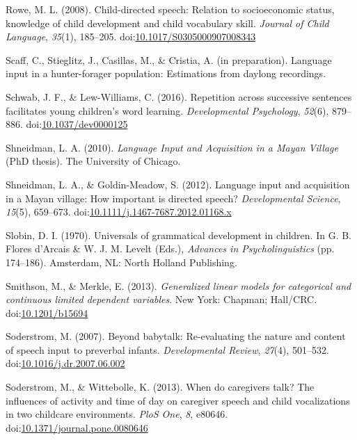 \documentclass[floatsintext,man]{apa6}
\theoremstyle{definition}
\theoremstyle{definition}
\theoremstyle{definition}
\theoremstyle{remark}
\begin{document}
\hypertarget{ref-rowe2008child}{}
Rowe, M. L. (2008). Child-directed speech: Relation to socioeconomic
status, knowledge of child development and child vocabulary skill.
\emph{Journal of Child Language}, \emph{35}(1), 185--205.
doi:\href{https://doi.org/10.1017/S0305000907008343}{10.1017/S0305000907008343}

\hypertarget{ref-scaffIPlanguage}{}
Scaff, C., Stieglitz, J., Casillas, M., \& Cristia, A. (in preparation).
Language input in a hunter-forager population: Estimations from daylong
recordings.

\hypertarget{ref-schwab2016repetition}{}
Schwab, J. F., \& Lew-Williams, C. (2016). Repetition across successive
sentences facilitates young children's word learning.
\emph{Developmental Psychology}, \emph{52}(6), 879--886.
doi:\href{https://doi.org/10.1037/dev0000125}{10.1037/dev0000125}

\hypertarget{ref-shneidman2010language}{}
Shneidman, L. A. (2010). \emph{Language Input and Acquisition in a Mayan
Village} (PhD thesis). The University of Chicago.

\hypertarget{ref-shneidman2012language}{}
Shneidman, L. A., \& Goldin-Meadow, S. (2012). Language input and
acquisition in a Mayan village: How important is directed speech?
\emph{Developmental Science}, \emph{15}(5), 659--673.
doi:\href{https://doi.org/10.1111/j.1467-7687.2012.01168.x}{10.1111/j.1467-7687.2012.01168.x}

\hypertarget{ref-slobin1970universals}{}
Slobin, D. I. (1970). Universals of grammatical development in children.
In G. B. Flores d'Arcais \& W. J. M. Levelt (Eds.), \emph{Advances in
Psycholinguistics} (pp. 174--186). Amsterdam, NL: North Holland
Publishing.

\hypertarget{ref-smithson2013generalized}{}
Smithson, M., \& Merkle, E. (2013). \emph{Generalized linear models for
categorical and continuous limited dependent variables}. New York:
Chapman; Hall/CRC.
doi:\href{https://doi.org/10.1201/b15694}{10.1201/b15694}

\hypertarget{ref-soderstrom2007beyond}{}
Soderstrom, M. (2007). Beyond babytalk: Re-evaluating the nature and
content of speech input to preverbal infants. \emph{Developmental
Review}, \emph{27}(4), 501--532.
doi:\href{https://doi.org/10.1016/j.dr.2007.06.002}{10.1016/j.dr.2007.06.002}

\hypertarget{ref-soderstrom2013when}{}
Soderstrom, M., \& Wittebolle, K. (2013). When do caregivers talk? The
influences of activity and time of day on caregiver speech and child
vocalizations in two childcare environments. \emph{PloS One}, \emph{8},
e80646.
doi:\href{https://doi.org/10.1371/journal.pone.0080646}{10.1371/journal.pone.0080646}
\end{document}
